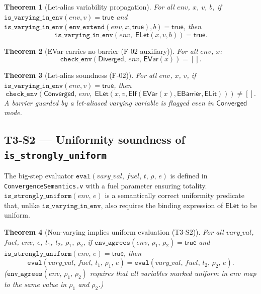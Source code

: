 \documentclass[11pt,a4paper]{article}
\theoremstyle{definition}
\theoremstyle{plain}
\newtheorem{theorem}{Theorem}[section]
\theoremstyle{remark}
\newcommand{\Converged}{\mathsf{Converged}}
\newcommand{\Diverged}{\mathsf{Diverged}}
\begin{document}
\begin{theorem}[Let-alias variability propagation]
  \label{thm:env-let-alias-varying}
  For all $\mathit{env}$, $x$, $v$, $b$, if
  $\mathtt{is\_varying\_in\_env}(\mathit{env}, v) = \mathsf{true}$ and
  $\mathtt{is\_varying\_in\_env}(\mathtt{env\_extend}(\mathit{env},x,\mathsf{true}), b) = \mathsf{true}$,
  then
  \[
    \mathtt{is\_varying\_in\_env}(\mathit{env},\;\mathsf{ELet}(x,v,b)) = \mathsf{true}.
  \]
\end{theorem}

\begin{theorem}[EVar carries no barrier (F-02 auxiliary)]
  \label{thm:env-var-diverged-clean}
  For all $\mathit{env}$, $x$:
  \[
    \mathtt{check\_env}(\Diverged,\,\mathit{env},\,\mathsf{EVar}(x)) = [].
  \]
\end{theorem}

\begin{theorem}[Let-alias soundness (F-02)]
  \label{thm:env-check-let-alias-catches}
  For all $\mathit{env}$, $x$, $v$, if
  $\mathtt{is\_varying\_in\_env}(\mathit{env}, v) = \mathsf{true}$, then
  \[
    \mathtt{check\_env}(\Converged,\,\mathit{env},\;
      \mathsf{ELet}(x,v,\mathsf{EIf}(\mathsf{EVar}(x),\mathsf{EBarrier},\mathsf{ELit})))
    \ne [].
  \]
  A barrier guarded by a let-aliased varying variable is flagged even in
  $\Converged$ mode.
\end{theorem}

\subsection{T3-S2 --- Uniformity soundness of \texttt{is\_strongly\_uniform}}
\label{sec:uniformity-props}

The big-step evaluator $\mathtt{eval}(\mathit{vary\_val},\,\mathit{fuel},\,t,\,\rho,\,e)$
is defined in \texttt{ConvergenceSemantics.v} with a fuel parameter ensuring
totality. $\mathtt{is\_strongly\_uniform}(\mathit{env},\,e)$ is a semantically
correct uniformity predicate that, unlike $\mathtt{is\_varying\_in\_env}$, also
requires the binding expression of $\mathsf{ELet}$ to be uniform.

\begin{theorem}[Non-varying implies uniform evaluation (T3-S2)]
  \label{thm:not-varying-uniform}
  For all $\mathit{vary\_val}$, $\mathit{fuel}$, $\mathit{env}$, $e$, $t_1$,
  $t_2$, $\rho_1$, $\rho_2$, if
  $\mathtt{env\_agrees}(\mathit{env},\,\rho_1,\,\rho_2) = \mathsf{true}$ and
  $\mathtt{is\_strongly\_uniform}(\mathit{env},\,e) = \mathsf{true}$, then
  \[
    \mathtt{eval}(\mathit{vary\_val},\,\mathit{fuel},\,t_1,\,\rho_1,\,e)
    = \mathtt{eval}(\mathit{vary\_val},\,\mathit{fuel},\,t_2,\,\rho_2,\,e).
  \]
  ($\mathtt{env\_agrees}(\mathit{env},\,\rho_1,\,\rho_2)$ requires that all
  variables marked uniform in $\mathit{env}$ map to the same value in $\rho_1$
  and $\rho_2$.)
\end{theorem}
\end{document}
